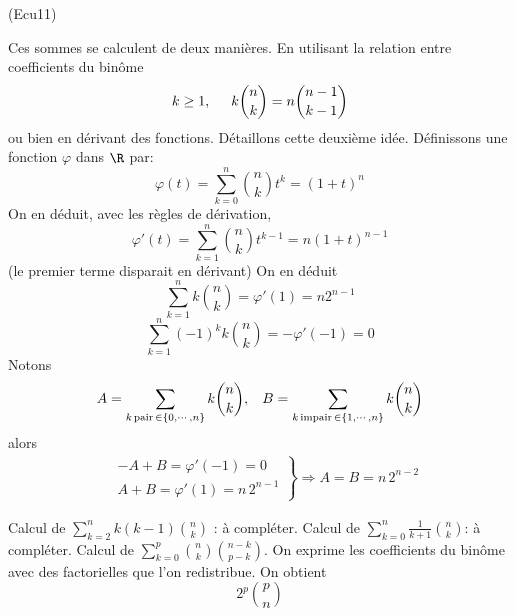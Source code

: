 \begin{tiny}(Ecu11)\end{tiny} Ces sommes se calculent de deux manières. En utilisant la relation entre coefficients du binôme
\begin{displaymath}
  k\geq1,\hspace{0.5cm} k\binom{n}{k} = n\binom{n-1}{k-1} 
\end{displaymath}
ou bien en dérivant des fonctions. Détaillons cette deuxième idée.\newline
Définissons une fonction $\varphi$ dans $\R$ par:
\begin{displaymath}
  \varphi(t) = \sum_{k=0}^n\binom{n}{k}t^k = (1+t)^n
\end{displaymath}
On en déduit, avec les règles de dérivation,
\begin{displaymath}
  \varphi'(t)= \sum_{k=1}^n\binom{n}{k}t^{k-1} = n(1+t)^{n-1}
\end{displaymath}
(le premier terme disparait en dérivant) On en déduit
\begin{displaymath}
  \sum_{k=1}^n k\binom{n}{k} = \varphi'(1)= n2^{n-1}
\end{displaymath}
\begin{displaymath}
  \sum_{k=1}^n (-1)^kk\binom{n}{k} = -\varphi'(-1)= 0
\end{displaymath}
Notons
\begin{displaymath}
A = \sum_{k \,\mathrm{ pair }\,\in \{ 0,\cdots ,n \}} k\binom{n}{k} ,\hspace{0.3cm}
B = \sum _{k \,\mathrm{ impair }\,\in \{ 1,\cdots,n \}}k\binom{n}{k}  
\end{displaymath}
alors
\begin{multline*}
\left. 
\begin{aligned}
  &-A + B = \varphi'(-1)=0 \\ &A+B = \varphi'(1) = n\,2^{n-1}
\end{aligned}
\right\rbrace  \Rightarrow A = B = n\,2^{n-2}
\end{multline*}

Calcul de $\sum_{k=2}^{n}k(k-1) \binom{n}{k}$ : à compléter.\newline
Calcul de $\sum_{k=0}^{n}\frac{1}{k+1} \binom{n}{k}$: à compléter. \newline
Calcul de $\sum_{k=0}^{p} \binom{n}{k} \binom{n-k}{p-k}$. On exprime les coefficients du binôme avec des factorielles que l'on redistribue. On obtient
\begin{displaymath}
 2^p\binom{p}{n}
\end{displaymath}

